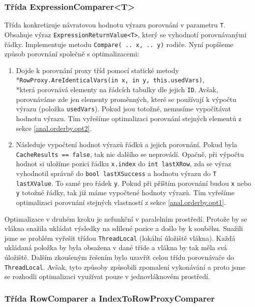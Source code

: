 \subsubsection{Třída ExpressionComparer<T>}

Třída konkretizuje návratovou hodnotu výrazu porovnání v parametru \texttt{T}.
Obsahuje výraz \texttt{ExpressionReturnValue<T>}, který se vyhodnotí porovnávanými řádky.
Implementuje metodu \texttt{Compare( .. x, .. y)} rodiče.
Nyní popíšeme způsob porovnání společně s optimalizacemi:

\begin{enumerate}
\item Dojde k porovnání proxy tříd pomocí statické metody \\*\texttt{RowProxy.AreIdenticalVars(in x, in y, this.usedVars)}, \\*která
porovnává elementy na řádcích tabulky dle jejich \texttt{ID}.
Avšak, porovnáváme zde jen elementy proměnných, které se používají k výpočtu výrazu (položka \texttt{usedVars}).
Pokud jsou totožné, nemusíme vypočítávat hodnotu výrazu.
Tím vyřešíme optimalizaci porovnání stejných elementů z sekce \ref{anal.orderby.opt2}.

\item Následuje vypočtení hodnot výrazů řádků a jejich porovnání.
Pokud byla \texttt{CacheResults == false}, tak nic dalšího se neprovádí.
Opačně, při výpočtu hodnot si uložíme pozici řádku \texttt{x.index} do \texttt{int lastXRow}, zda se výraz vyhodnotil správně do \texttt{bool lastXSuccess} a hodnotu výrazu do \texttt{T lastXValue}.
To samé pro řádek \texttt{y}.
Pokud při příštím porovnání budou \texttt{x} nebo \texttt{y} totožné řádky, tak již máme vypočtené hodnoty výrazů. 
Tím vyřešíme optimalizaci porovnání stejných vlastností z sekce \ref{anal.orderby.opt1}.
\end{enumerate}

Optimalizace v druhém kroku je nefunkční v paralelním prostředí.
Protože by se vlákna snažila ukládat výsledky na sdílené pozice a došlo by k souběhu.
Snažili jsme se problém vyřešit třídou \texttt{ThreadLocal} (lokální úložiště vlákna).
Každá ukládaná položka by byla obsažena v dané tříde a vlákna by tak měla svá úložiště.
Dalším zkoušeným řešením bylo uzavřít celou třídu porovnávače do \texttt{ThreadLocal}.
Avšak, tyto způsoby způsobili zpomalení vykonávání a proto jsme se rozhodli optimalizaci využívat pouze v jednovláknovém prostředí.

\subsubsection{Třída RowComparer a IndexToRowProxyComparer}

